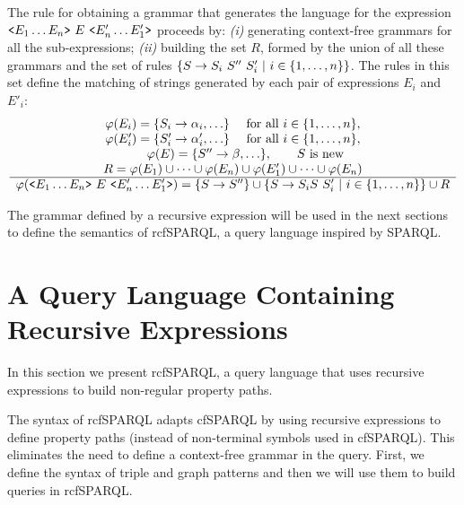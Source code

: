 \documentclass[runningheads]{llncs}
\begin{document}


The rule for obtaining a grammar that generates the language for the expression $\rep{E_1 \dots E_n}{\ E\ }{E'_n\dots E'_1}$ proceeds by:
\textit{(i)} generating context-free grammars for all the sub-expressions;
\textit{(ii)} building the set $R$, formed by the union of all these grammars and the set of rules $\set{\Rule{S}{S_i\ S''\ S'_i}\ |\ i\in\set{1,\dots,n}}$.
The rules in this set define the matching of strings generated by each pair of expressions $E_i$ and $E'_i$:
\[
\pfrule{ 
\varphi(E_i) = \set{\Rule{S_i}{\alpha_i}, \dots}\quad \mbox{ for all } i\in\set{1,\dots,n},\\
\varphi(E'_i) = \set{\Rule{S'_i}{\alpha'_i}, \dots}\quad \mbox{ for all } i\in\set{1,\dots,n},\\
\qquad \varphi(E) = \set{\Rule{S''}{\beta}, \dots}, \qquad S\mbox{ is new}\\
R = \varphi(E_1) \cup \dots \cup \varphi(E_n) \cup \varphi(E'_1) \cup \dots \cup \varphi(E_n)
}{
\varphi(\rep{E_1 \dots E_n}{\ E\ }{E'_n\dots E'_1}) = \set{\Rule{S}{S''}} \cup \set{\Rule{S}{ S_i S\ S_i'}\ |\ i\in\set{1,\dots,n}} \cup R
}
\]

The grammar defined by a recursive expression will be used in the next sections to define the semantics of \textsf{rcfSPARQL}, a query language inspired by SPARQL.




\section{A Query Language Containing Recursive Expressions}
\label{sec:query_language}

In this section we present \textsf{rcfSPARQL}, a query language that uses recursive expressions to build non-regular property paths.

The syntax of \textsf{rcfSPARQL} adapts \textsf{cfSPARQL} by using recursive expressions to define property paths (instead of non-terminal symbols used in \textsf{cfSPARQL}).
This eliminates the need to define a context-free grammar in the query.
First, we define the syntax of triple and graph patterns and then we will use them to build queries in \textsf{rcfSPARQL}.
\end{document}
